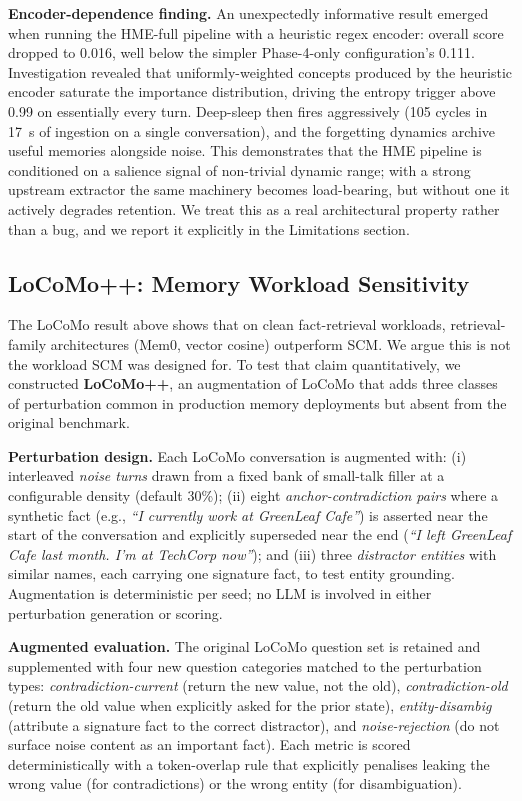 \documentclass[11pt,twocolumn]{article}
\begin{document}
\textbf{Encoder-dependence finding.} An unexpectedly informative result emerged when running the HME-full pipeline with a heuristic regex encoder: overall score dropped to 0.016, well below the simpler Phase-4-only configuration's 0.111. Investigation revealed that uniformly-weighted concepts produced by the heuristic encoder saturate the importance distribution, driving the entropy trigger above 0.99 on essentially every turn. Deep-sleep then fires aggressively (105 cycles in 17~s of ingestion on a single conversation), and the forgetting dynamics archive useful memories alongside noise. This demonstrates that the HME pipeline is conditioned on a salience signal of non-trivial dynamic range; with a strong upstream extractor the same machinery becomes load-bearing, but without one it actively degrades retention. We treat this as a real architectural property rather than a bug, and we report it explicitly in the Limitations section.

\subsection{LoCoMo++: Memory Workload Sensitivity}
\label{sec:locomo_plus}

The LoCoMo result above shows that on clean fact-retrieval workloads, retrieval-family architectures (Mem0, vector cosine) outperform SCM. We argue this is not the workload SCM was designed for. To test that claim quantitatively, we constructed \textbf{LoCoMo++}, an augmentation of LoCoMo that adds three classes of perturbation common in production memory deployments but absent from the original benchmark.

\textbf{Perturbation design.} Each LoCoMo conversation is augmented with: (i) interleaved \emph{noise turns} drawn from a fixed bank of small-talk filler at a configurable density (default 30\%); (ii) eight \emph{anchor-contradiction pairs} where a synthetic fact (e.g., \textit{``I currently work at GreenLeaf Cafe''}) is asserted near the start of the conversation and explicitly superseded near the end (\textit{``I left GreenLeaf Cafe last month. I'm at TechCorp now''}); and (iii) three \emph{distractor entities} with similar names, each carrying one signature fact, to test entity grounding. Augmentation is deterministic per seed; no LLM is involved in either perturbation generation or scoring.

\textbf{Augmented evaluation.} The original LoCoMo question set is retained and supplemented with four new question categories matched to the perturbation types: \emph{contradiction-current} (return the new value, not the old), \emph{contradiction-old} (return the old value when explicitly asked for the prior state), \emph{entity-disambig} (attribute a signature fact to the correct distractor), and \emph{noise-rejection} (do not surface noise content as an important fact). Each metric is scored deterministically with a token-overlap rule that explicitly penalises leaking the wrong value (for contradictions) or the wrong entity (for disambiguation).
\end{document}
